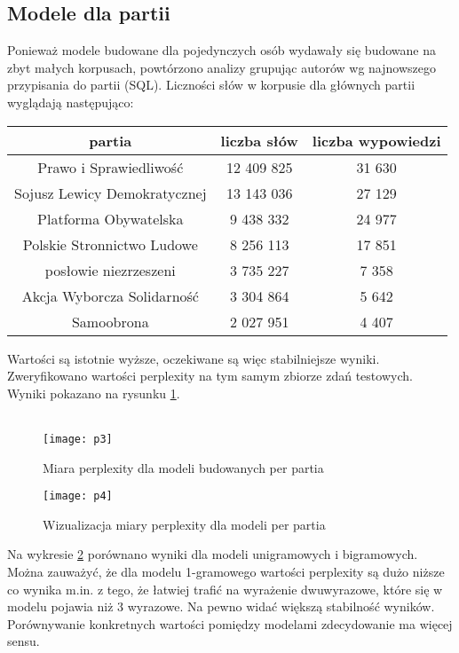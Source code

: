 \documentclass[a4paper,11pt,twoside]{report}
\theoremstyle{definition}
\begin{document}
\subsection{Modele dla partii}
Ponieważ modele budowane dla pojedynczych osób wydawały się budowane na zbyt małych korpusach, powtórzono analizy grupując autorów wg najnowszego przypisania do partii (SQL). Liczności słów w korpusie dla głównych partii wyglądają następująco:
\begin{center}
\begin{tabular}{|c|c|c|} 
\hline
partia & liczba słów & liczba wypowiedzi \\ \hline
Prawo i Sprawiedliwość & 12 409 825 & 31 630 \\ \hline
Sojusz Lewicy Demokratycznej & 13 143 036 & 27 129 \\ \hline
Platforma Obywatelska & 9 438 332 & 24 977 \\ \hline
Polskie Stronnictwo Ludowe & 8 256 113 & 17 851 \\ \hline
posłowie niezrzeszeni & 3 735 227 & 7 358 \\ \hline
Akcja Wyborcza Solidarność & 3 304 864 & 5 642 \\ \hline
Samoobrona & 2 027 951 & 4 407 \\ \hline
\end{tabular}
\end{center}
Wartości są istotnie wyższe, oczekiwane są więc stabilniejsze wyniki. \\
Zweryfikowano wartości perplexity na tym samym zbiorze zdań testowych. Wyniki pokazano na rysunku \ref{pic:53}. \\\\
\begin{figure}[h] 
\texttt{[image: p3]} 
\centering
\caption{Miara perplexity dla modeli budowanych per partia} \label{pic:53}
\end{figure} 
\begin{figure}[h] 
\texttt{[image: p4]} 
\centering
\caption{Wizualizacja miary perplexity dla modeli per partia} \label{pic:54}
\end{figure}

Na wykresie \ref{pic:54} porównano wyniki dla modeli unigramowych i bigramowych.
Można zauważyć, że dla modelu 1-gramowego wartości perplexity są dużo niższe co wynika m.in. z tego, że łatwiej trafić na wyrażenie dwuwyrazowe, które się w modelu pojawia niż 3 wyrazowe. Na pewno widać większą stabilność wyników. Porównywanie konkretnych wartości pomiędzy modelami zdecydowanie ma więcej sensu.
\end{document}
